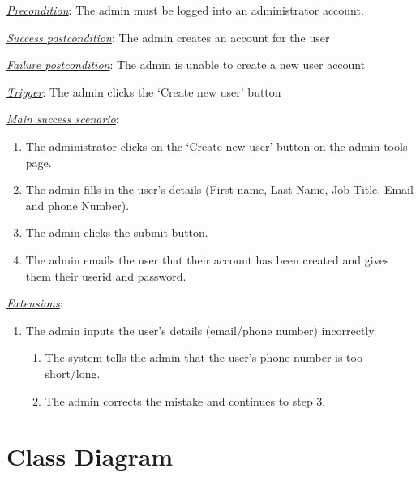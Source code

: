 \documentclass[a4paper]{article}
\begin{document}
\underline{\textit{Precondition}}: The admin must be logged into an administrator account.

\underline{\textit{Success postcondition}}: The admin creates an account for the user

\underline{\textit{Failure postcondition}}: The admin is unable to create a new user account

\underline{\textit{Trigger}}: The admin clicks the ‘Create new user’ button

\underline{\textit{Main success scenario}}: 
\begin{enumerate}[leftmargin = 3em]
    \item The administrator clicks on the ‘Create new user’ button on the admin tools page.
    \item The admin fills in the user’s details (First name, Last Name, Job Title, Email and phone Number).
    \item The admin clicks the submit button.
    \item The admin emails the user that their account has been created and gives them their userid and password.
\end{enumerate} 

\underline{\textit{Extensions}}:
\begin{enumerate}[label=3\alph*, leftmargin = 3em]
    \item The admin inputs the user’s details (email/phone number) incorrectly. 
    \begin{enumerate}[label=\arabic*.]
        \item The system tells the admin that the user's phone number is too short/long.
        \item The admin corrects the mistake and continues to step 3.
    \end{enumerate}
\end{enumerate}

\clearpage
\section{Class Diagram}
\end{document}
